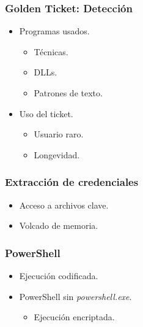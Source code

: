 \documentclass[a4paper,10pt]{beamer}
\newcommand{\linej}{\hfill\break}
\begin{document}
\begin{frame}[fragile]
	\frametitle{Golden Ticket: Detección}

	\begin{itemize}
		\item Programas usados. %
		\begin{itemize}
			\item Técnicas. %
			\item DLLs. %
			\item Patrones de texto. %
		\end{itemize}
		\linej
		\item Uso del ticket. %
		\begin{itemize}
			\item Usuario raro.
			\item Longevidad. %
		\end{itemize}
	\end{itemize}
\end{frame}

\begin{frame}[fragile]
	\frametitle{Extracción de credenciales}

	\begin{itemize}
		\item Acceso a archivos clave.
		\item Volcado de memoria.
	\end{itemize}
\end{frame}

\begin{frame}[fragile]
	\frametitle{PowerShell}

	\begin{itemize}
		\item Ejecución codificada. %
		\item PowerShell sin \textit{powershell.exe}. %
		\begin{itemize}
			\item Ejecución encriptada. %
		\end{itemize}
	\end{itemize}
\end{frame}
\end{document}
